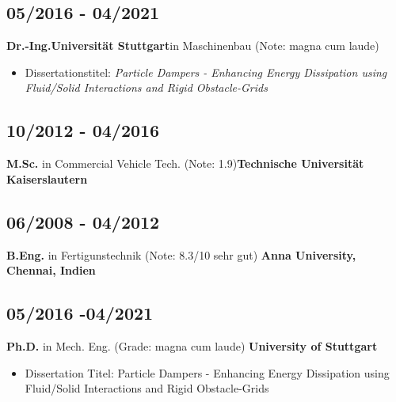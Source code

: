 \documentclass{mycv}
\begin{document}
{\rlap{\color{templateColor4}\rule[0mm]{\textwidth}{\ulinewidth}}}
\begin{paracol}{2}
    \switchcolumn
    {
            \subsection{05/2016 - 04/2021}{\bfseries Dr.-Ing.}{\bfseries Universit{\"a}t
            Stuttgart}{in Maschinenbau (Note: magna cum laude)}
              \begin{itemize}
                  \item Dissertationstitel: \textit{Particle Dampers - Enhancing
                      Energy Dissipation using Fluid/Solid Interactions and Rigid
                  Obstacle-Grids}
              \end{itemize}
            
              \subsection{10/2012 - 04/2016}{{\bfseries M.Sc.} in Commercial
            Vehicle Tech. (Note: 1.9)}{\bfseries Technische Universit{\"a}t Kaiserslautern
            }\\
            
            \subsection{06/2008 - 04/2012}{{\bfseries B.Eng.} in
            Fertigunstechnik (Note:
            8.3/10 {sehr gut})} {\bfseries Anna University, Chennai, Indien }\\
    
    }
    {
            \subsection{05/2016 -04/2021}
            {{\bfseries Ph.D.} in Mech. Eng. (Grade: magna cum laude)}
            {\bfseries University of Stuttgart}
              \begin{itemize}
                  \item Dissertation Titel: Particle Dampers - Enhancing
                      Energy Dissipation using Fluid/Solid Interactions and Rigid
                      Obstacle-Grids
              \end{itemize}
    
}
\end{paracol}
\end{document}
